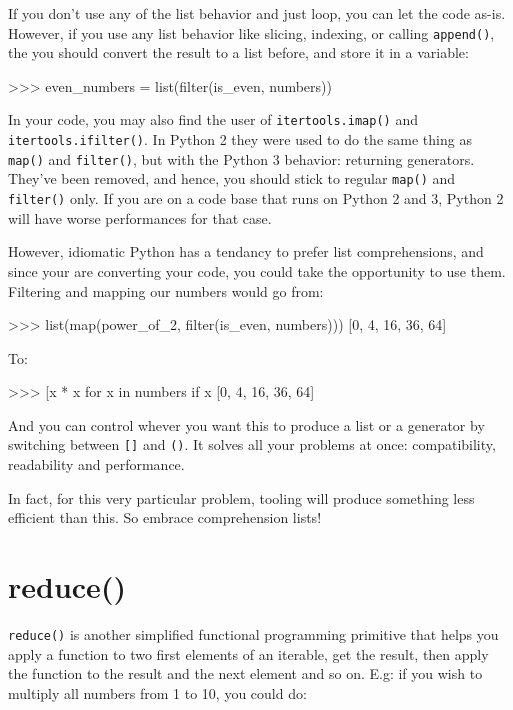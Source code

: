 If you don't use any of the list behavior and just loop, you can let the code as-is. However, if you use any list behavior like slicing, indexing, or calling \lstinline{append()}, the you should convert the result to a list before, and store it in a variable:

\begin{py2and3}
>>> even_numbers = list(filter(is_even, numbers))
\end{py2and3}

In your code, you may also find the user of \lstinline{itertools.imap()} and \lstinline{itertools.ifilter()}. In Python 2 they were used to do the same thing as \lstinline{map()} and \lstinline{filter()}, but with the Python 3 behavior: returning generators. They've been removed, and hence, you should stick to regular \lstinline{map()} and \lstinline{filter()} only. If you are on a code base that runs on Python 2 and 3, Python 2 will have worse performances for that case.

However, idiomatic Python has a tendancy to prefer \glspl{list comprehension}, and since your are converting your code, you could take the opportunity to use them. Filtering and mapping our numbers would go from:

\begin{py2and3}
>>> list(map(power_of_2, filter(is_even, numbers)))
[0, 4, 16, 36, 64]
\end{py2and3}

To:

\begin{py2and3}
>>> [x * x for x in numbers if x %
[0, 4, 16, 36, 64]
\end{py2and3}

And you can control whever you want this to produce a list or a generator by switching between \lstinline{[]} and \lstinline{()}. It solves all your problems at once: compatibility, readability and performance.

In fact, for this very particular problem, tooling will produce something less efficient than this. So embrace comprehension lists!

\section{reduce()}

\lstinline{reduce()} is another simplified functional programming primitive that helps you apply a function to two first elements of an iterable, get the result, then apply the function to the result and the next element and so on. E.g: if you wish to multiply all numbers from 1 to 10, you could do:

